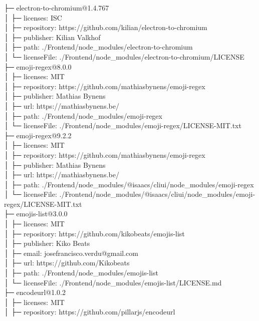 ├─ electron-to-chromium@1.4.767\\
│  ├─ licenses: ISC\\
│  ├─ repository: https://github.com/kilian/electron-to-chromium\\
│  ├─ publisher: Kilian Valkhof\\
│  ├─ path: ./Frontend/node\_modules/electron-to-chromium\\
│  └─ licenseFile: ./Frontend/node\_modules/electron-to-chromium/LICENSE\\
├─ emoji-regex@8.0.0\\
│  ├─ licenses: MIT\\
│  ├─ repository: https://github.com/mathiasbynens/emoji-regex\\
│  ├─ publisher: Mathias Bynens\\
│  ├─ url: https://mathiasbynens.be/\\
│  ├─ path: ./Frontend/node\_modules/emoji-regex\\
│  └─ licenseFile: ./Frontend/node\_modules/emoji-regex/LICENSE-MIT.txt\\
├─ emoji-regex@9.2.2\\
│  ├─ licenses: MIT\\
│  ├─ repository: https://github.com/mathiasbynens/emoji-regex\\
│  ├─ publisher: Mathias Bynens\\
│  ├─ url: https://mathiasbynens.be/\\
│  ├─ path: ./Frontend/node\_modules/@isaacs/cliui/node\_modules/emoji-regex\\
│  └─ licenseFile: ./Frontend/node\_modules/@isaacs/cliui/node\_modules/emoji-regex/LICENSE-MIT.txt\\
├─ emojis-list@3.0.0\\
│  ├─ licenses: MIT\\
│  ├─ repository: https://github.com/kikobeats/emojis-list\\
│  ├─ publisher: Kiko Beats\\
│  ├─ email: josefrancisco.verdu@gmail.com\\
│  ├─ url: https://github.com/Kikobeats\\
│  ├─ path: ./Frontend/node\_modules/emojis-list\\
│  └─ licenseFile: ./Frontend/node\_modules/emojis-list/LICENSE.md\\
├─ encodeurl@1.0.2\\
│  ├─ licenses: MIT\\
│  ├─ repository: https://github.com/pillarjs/encodeurl\\

